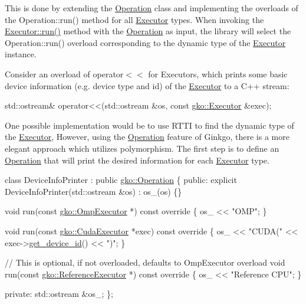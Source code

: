 This is done by extending the \hyperlink{classgko_1_1Operation}{Operation} class and implementing the overloads of the Operation\+::run() method for all \hyperlink{classgko_1_1Executor}{Executor} types. When invoking the \hyperlink{classgko_1_1Executor_a1de8e2668b76e66690acf5eef9e8324d}{Executor\+::run()} method with the \hyperlink{classgko_1_1Operation}{Operation} as input, the library will select the Operation\+::run() overload corresponding to the dynamic type of the \hyperlink{classgko_1_1Executor}{Executor} instance.

Consider an overload of {\ttfamily operator$<$$<$} for Executors, which prints some basic device information (e.\+g. device type and id) of the \hyperlink{classgko_1_1Executor}{Executor} to a C++ stream\+:


\begin{DoxyCode}
std::ostream& operator<<(std::ostream &os, \textcolor{keyword}{const} \hyperlink{classgko_1_1Executor}{gko::Executor} &exec);
\end{DoxyCode}


One possible implementation would be to use R\+T\+TI to find the dynamic type of the \hyperlink{classgko_1_1Executor}{Executor}, However, using the \hyperlink{classgko_1_1Operation}{Operation} feature of Ginkgo, there is a more elegant approach which utilizes polymorphism. The first step is to define an \hyperlink{classgko_1_1Operation}{Operation} that will print the desired information for each \hyperlink{classgko_1_1Executor}{Executor} type.


\begin{DoxyCode}
\textcolor{keyword}{class }DeviceInfoPrinter : \textcolor{keyword}{public} \hyperlink{classgko_1_1Operation}{gko::Operation} \{
\textcolor{keyword}{public}:
    \textcolor{keyword}{explicit} DeviceInfoPrinter(std::ostream &os) : os\_(os) \{\}

    \textcolor{keywordtype}{void} run(\textcolor{keyword}{const} \hyperlink{classgko_1_1OmpExecutor}{gko::OmpExecutor} *)\textcolor{keyword}{ const override }\{ os\_ << \textcolor{stringliteral}{"OMP"}; \}

    \textcolor{keywordtype}{void} run(\textcolor{keyword}{const} \hyperlink{classgko_1_1CudaExecutor}{gko::CudaExecutor} *exec)\textcolor{keyword}{ const override}
\textcolor{keyword}{    }\{ os\_ << \textcolor{stringliteral}{"CUDA("} << exec->\hyperlink{classgko_1_1CudaExecutor_a7cfa915eadd2329eb897dc1ee2712488}{get\_device\_id}() << \textcolor{stringliteral}{")"}; \}

    \textcolor{comment}{// This is optional, if not overloaded, defaults to OmpExecutor overload}
    \textcolor{keywordtype}{void} run(\textcolor{keyword}{const} \hyperlink{classgko_1_1ReferenceExecutor}{gko::ReferenceExecutor} *)\textcolor{keyword}{ const override}
\textcolor{keyword}{    }\{ os\_ << \textcolor{stringliteral}{"Reference CPU"}; \}

\textcolor{keyword}{private}:
    std::ostream &os\_;
\};
\end{DoxyCode}


